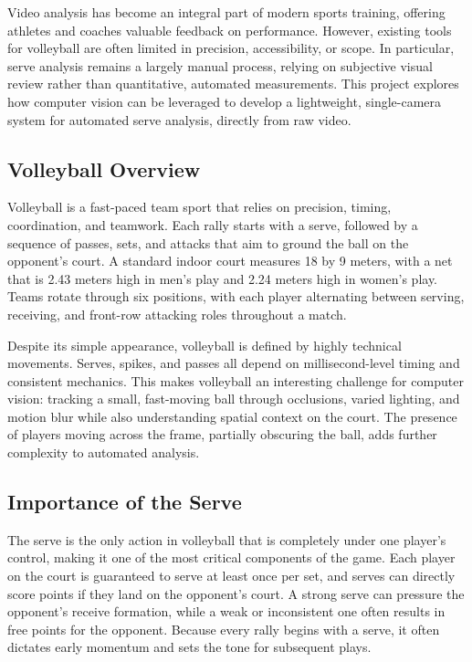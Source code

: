 Video analysis has become an integral part of modern sports training, offering athletes and coaches valuable feedback on performance. However, existing tools for volleyball are often limited in precision, accessibility, or scope. In particular, serve analysis remains a largely manual process, relying on subjective visual review rather than quantitative, automated measurements. This project explores how computer vision can be leveraged to develop a lightweight, single-camera system for automated serve analysis, directly from raw video.

\subsection{Volleyball Overview}
Volleyball is a fast-paced team sport that relies on precision, timing, coordination, and teamwork. Each rally starts with a serve, followed by a sequence of passes, sets, and attacks that aim to ground the ball on the opponent's court. A standard indoor court measures 18 by 9 meters, with a net that is 2.43 meters high in men's play and 2.24 meters high in women's play. Teams rotate through six positions, with each player alternating between serving, receiving, and front-row attacking roles throughout a match.

Despite its simple appearance, volleyball is defined by highly technical movements. Serves, spikes, and passes all depend on millisecond-level timing and consistent mechanics. This makes volleyball an interesting challenge for computer vision: tracking a small, fast-moving ball through occlusions, varied lighting, and motion blur while also understanding spatial context on the court. The presence of players moving across the frame, partially obscuring the ball, adds further complexity to automated analysis.

\subsection{Importance of the Serve}
The serve is the only action in volleyball that is completely under one player's control, making it one of the most critical components of the game. Each player on the court is guaranteed to serve at least once per set, and serves can directly score points if they land on the opponent's court. A strong serve can pressure the opponent's receive formation, while a weak or inconsistent one often results in free points for the opponent. Because every rally begins with a serve, it often dictates early momentum and sets the tone for subsequent plays.

